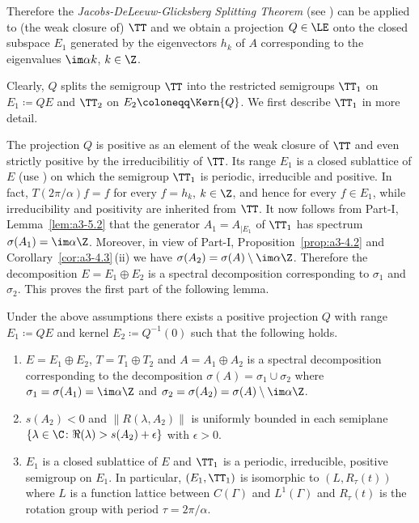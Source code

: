 Therefore the \emph{Jacobs-DeLeeuw-Glicksberg Splitting Theorem} (see \textcite[Chapter 2, Theorem 4.4 and 4.5]{krengel:1985}) can be applied to (the weak closure of) $\TT$ and we obtain a projection $Q \in \LE$ onto the closed subspace $E_{1}$ generated by the eigenvectors $h_{k}$ of\/ $A$ corresponding to the eigenvalues $\im\alpha k$, $k \in \Z$.

Clearly, $Q$ splits the semigroup $\TT$ into the restricted semigroups $\TT_{1}$ on $E_{1} \coloneqq QE$ and $\TT_{2}$ on $E_{2} \coloneqq \Kern{Q}$.
We first describe $\TT_{1}$ in more detail.

The projection $Q$ is positive as an element of the weak closure of\/ $\TT$ and even strictly positive by the irreducibilitiy of\/ $\TT$.
Its range $E_{1}$ is a closed sublattice of\/ $E$ (use \textcite[Proposition III.11.5]{schaefer:1974}) on which the semigroup $\TT_{1}$ is periodic, irreducible and positive.
In fact, $T(2\pi/\alpha)f = f$ for every $f = h_{k}$, $k \in \Z$, and hence for every $f \in E_{1}$, while irreducibility and positivity are inherited from $\TT$.
It now follows from 
Part-I, Lemma~\ref{lem:a3-5.2}
that the generator $A_{1} = A_{|E_{1}}$ of\/ $\TT_{1}$ has spectrum $\sigma(A_{1}) = \im\alpha\Z$.
Moreover, in view of 
Part-I, Proposition~\ref{prop:a3-4.2} and Corollary~\ref{cor:a3-4.3}\,(ii) 
we have $\sigma(A_{2}) = \sigma(A) \setminus \im\alpha\Z$.
Therefore the decomposition $E = E_{1} \oplus E_{2}$ is a spectral decomposition corresponding to $\sigma_{1}$ and $\sigma_{2}$.
This proves the first part of the following lemma.
\begin{lemma}\label{lem:c4-2.12}%
Under the above assumptions there exists a positive projection $Q$ with range $E_{1} \coloneqq QE$ and kernel $E_{2} \coloneqq Q^{-1}(0)$ such that the following holds.
\begin{enumerate}[\upshape (i)]
\item \label{lem:c4-2.12-1}
$E = E_{1} \oplus E_{2}$, $T = T_{1} \oplus T_{2}$ and $A = A_{1} \oplus A_{2}$ is a spectral decomposition corresponding to the decomposition $\sigma(A) = \sigma_{1} \cup \sigma_{2}$ where $\sigma_{1} = \sigma(A_{1}) = \im\alpha\Z$ and $\sigma_{2} = \sigma(A_{2}) = \sigma(A) \setminus \im\alpha\Z$.

\item \label{lem:c4-2.12-2}
$s(A_{2}) < 0$ and $\|R(\lambda,A_{2})\|$ is uniformly bounded in each semiplane\\ 
$\{\lambda \in \C \colon \Re(\lambda) > s(A_{2}) + \epsilon\}$ with $\epsilon > 0$.

\item \label{lem:c4-2.12-3}
$E_{1}$ is a closed sublattice of\/ $E$ and $\TT_{1}$ is a periodic, irreducible, positive semigroup on $E_{1}$.
In particular, $(E_{1},\TT_{1})$ is isomorphic to $(L,R_{\tau}(t))$ where $L$ is a function lattice between $C(\Gamma)$ and $L^{1}(\Gamma)$ and $R_{\tau}(t)$ is the rotation group with period $\tau = 2\pi/\alpha$.
\end{enumerate}
\end{lemma}
